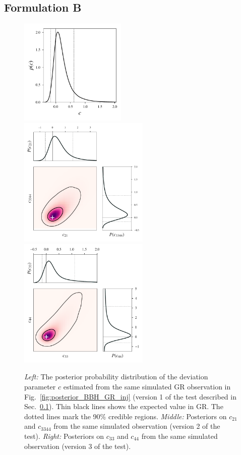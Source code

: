 \documentclass[prd,preprintnumbers,twocolumn,eqsecnum,floatfix,a4paper,nofootinbib,superscriptaddress]{revtex4}
\begin{document}
\subsection{Formulation B}
\label{sec:formulationB}

\begin{figure}[tbh]
	\begin{center}
 		\includegraphics[height=2.0in]{figs/hist_c1_M_80_q_9_SNR_25.pdf}
		\includegraphics[height=2.45in]{figs/c2_c34_M_80_q_9_SNR_25.pdf}
		\includegraphics[height=2.45in]{figs/c3_c4_M_80_q_9_SNR_25.pdf}
	\end{center} 
 	\caption{\emph{Left:} The posterior probability distribution of the deviation parameter $c$ estimated from the same simulated GR observation in Fig.~\ref{fig:posterior_BBH_GR_inj} (version 1 of the test described in Sec.~\ref{sec:formulationB}). Thin black lines shows the expected value in GR. The dotted lines mark the 90\% credible regions. \emph{Middle:} Posteriors on $c_{21}$ and $c_{3344}$ from the same simulated observation (version 2 of the test). \emph{Right:} Posteriors on $c_{33}$ and $c_{44}$ from the same simulated observation (version 3 of the test).} 
	\label{fig:test2posts}
\end{figure}
\end{document}
